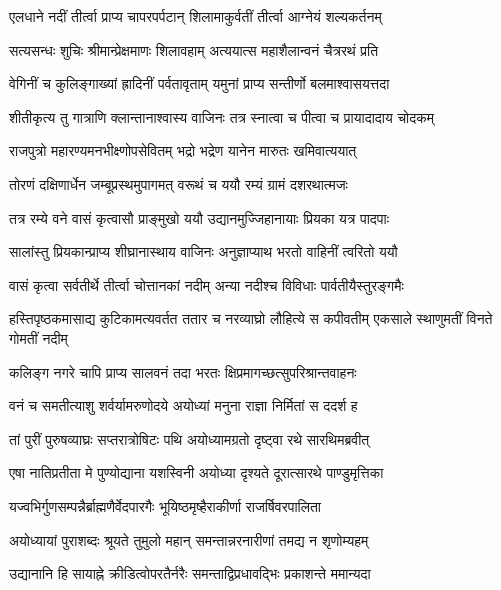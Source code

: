 \twolineshloka
{एलधाने नदीं तीर्त्वा प्राप्य चापरपर्पटान्}
{शिलामाकुर्वतीं तीर्त्वा आग्नेयं शल्यकर्तनम्} %

\twolineshloka
{सत्यसन्धः शुचिः श्रीमान्प्रेक्षमाणः शिलावहाम्}
{अत्ययात्स महाशैलान्वनं चैत्ररथं प्रति} %

\twolineshloka
{वेगिनीं च कुलिङ्गाख्यां ह्रादिनीं पर्वतावृताम्}
{यमुनां प्राप्य सन्तीर्णो बलमाश्वासयत्तदा} %

\twolineshloka
{शीतीकृत्य तु गात्राणि क्लान्तानाश्वास्य वाजिनः}
{तत्र स्नात्वा च पीत्वा च प्रायादादाय चोदकम्} %

\twolineshloka
{राजपुत्रो महारण्यमनभीक्ष्णोपसेवितम्}
{भद्रो भद्रेण यानेन मारुतः खमिवात्ययात्} %

\twolineshloka
{तोरणं दक्षिणार्धेन जम्बूप्रस्थमुपागमत्}
{वरूथं च ययौ रम्यं ग्रामं दशरथात्मजः} %

\twolineshloka
{तत्र रम्ये वने वासं कृत्वासौ प्राङ्मुखो ययौ}
{उद्यानमुज्जिहानायाः प्रियका यत्र पादपाः} %

\twolineshloka
{सालांस्तु प्रियकान्प्राप्य शीघ्रानास्थाय वाजिनः}
{अनुज्ञाप्याथ भरतो वाहिनीं त्वरितो ययौ} %

\twolineshloka
{वासं कृत्वा सर्वतीर्थे तीर्त्वा चोत्तानकां नदीम्}
{अन्या नदीश्च विविधाः पार्वतीयैस्तुरङ्गमैः} %

\threelineshloka
{हस्तिपृष्ठकमासाद्य कुटिकामत्यवर्तत}
{ततार च नरव्याघ्रो लौहित्ये स कपीवतीम्}
{एकसाले स्थाणुमतीं विनते गोमतीं नदीम्} %

\twolineshloka
{कलिङ्ग नगरे चापि प्राप्य सालवनं तदा}
{भरतः क्षिप्रमागच्छत्सुपरिश्रान्तवाहनः} %

\twolineshloka
{वनं च समतीत्याशु शर्वर्यामरुणोदये}
{अयोध्यां मनुना राज्ञा निर्मितां स ददर्श ह} %

\twolineshloka
{तां पुरीं पुरुषव्याघ्रः सप्तरात्रोषिटः पथि}
{अयोध्यामग्रतो दृष्ट्वा रथे सारथिमब्रवीत्} %

\twolineshloka
{एषा नातिप्रतीता मे पुण्योद्याना यशस्विनी}
{अयोध्या दृश्यते दूरात्सारथे पाण्डुमृत्तिका} %

\twolineshloka
{यज्वभिर्गुणसम्पन्नैर्ब्राह्मणैर्वेदपारगैः}
{भूयिष्ठमृष्हैराकीर्णा राजर्षिवरपालिता} %

\twolineshloka
{अयोध्यायां पुराशब्दः श्रूयते तुमुलो महान्}
{समन्तान्नरनारीणां तमद्य न शृणोम्यहम्} %

\twolineshloka
{उद्यानानि हि सायाह्ने क्रीडित्वोपरतैर्नरैः}
{समन्ताद्विप्रधावद्भिः प्रकाशन्ते ममान्यदा} %


